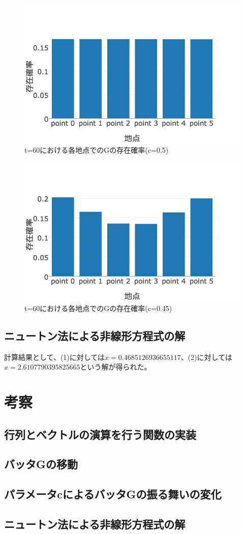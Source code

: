 \documentclass[11pt]{ltjsarticle}
\begin{document}
\begin{figure}
  \includegraphics[width=\textwidth]{fig5.png}
  \caption{ t=60における各地点でのGの存在確率(c=0.5)}
\end{figure}

\begin{figure}
  \includegraphics[width=\textwidth]{fig6.png}
  \caption{ t=60における各地点でのGの存在確率(c=0.45)}
\end{figure}

\subsection{ニュートン法による非線形方程式の解}

計算結果として、(1)に対しては$x = 0.4685126936655117$、(2)に対しては$x = 2.6107790395825665$という解が得られた。


\section{考察}

\subsection{行列とベクトルの演算を行う関数の実装}

\subsection{バッタGの移動}
\subsection{パラメータcによるバッタGの振る舞いの変化}
\subsection{ニュートン法による非線形方程式の解}
\end{document}
